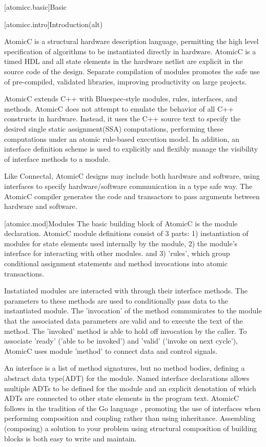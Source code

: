 [atomicc.basic]{Basic}

[atomicc.intro]{Introduction(alt)}

AtomicC is a structural hardware description language, permitting
the high level specification of algorithms to be instantiated
directly in hardware.
AtomicC is a timed HDL and all state elements in the hardware
netlist are explicit in the source code of the design.
Separate compilation of modules promotes the safe use of pre-compiled, validated
libraries, improving productivity on large projects.

AtomicC extends C++
with Bluespec-style\cite{Bluespec:www,Hoe:Thesis,HoeArvind:TRS_Synthesis2}
modules, rules, interfaces, and methods.
AtomicC does not attempt to emulate the behavior of all C++ constructs in hardware.
Instead, it uses the C++ source text to specify the desired
single static assignment(SSA) computations,
performing these computations under an atomic rule-based execution model.
In addition, an interface definition scheme is used to explicitly and flexibly
manage the visibility of interface methods to a module.

Like Connectal, AtomicC designs may include both hardware and
software, using interfaces to specify hardware/software communication
in a type safe way. The AtomicC compiler generates the code and transactors to pass
arguments between hardware and software.

[atomicc.mod]{Modules}
The basic building block of AtomicC is the module declaration.
AtomicC module definitions consist of 3 parts:
1) instantiation of modules for state elements used internally by the module,
2) the module's interface for interacting with other modules.
and 3) 'rules', which group conditional assignment statements and method invocations into atomic transactions.

Instatiated modules are interacted with through their interface methods.  The parameters
to these methods are used to conditionally pass data to the instantiated module.
The 'invocation' of the method communicates to the module that the associated
data parameters are valid and to execute the text of the method.
The 'invoked' method is able to hold off invocation by the caller.
To associate 'ready' ('able to be invoked')
and 'valid' ('invoke on next cycle'), AtomicC uses module 'method' to connect data
and control signals.

An interface is a list of method signatures, but no method bodies, defining
a abstract data type(ADT)\cite{Liskov74programmingwith} for the module.
Named interface declarations allows multiple ADTs to be defined for
the module and an explicit denotation of which ADTs are connected to other
state elements in the program text.
AtomicC follows in the tradition of the Go language \cite{Pike2012},
promoting the use of interfaces when performing composition and
coupling rather than using inheritance.  Assembling (composing) a solution
to your problem using structural composition of building blocks
is both easy to write and maintain.

